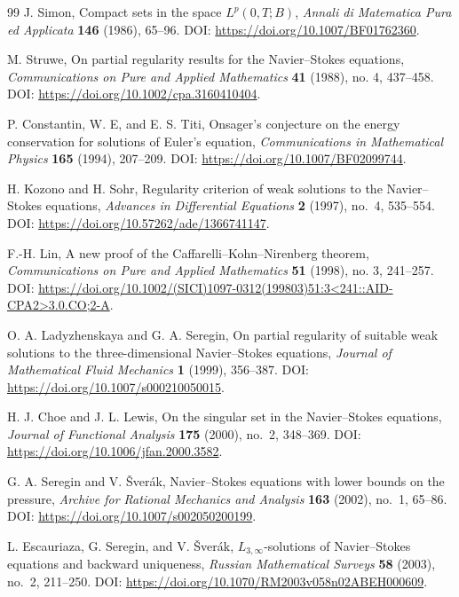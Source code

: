 \documentclass[11pt]{article}
\numberwithin{equation}{section}
\begin{document}
\begin{thebibliography}{99}
	J. Simon,
	Compact sets in the space $L^p(0,T;B)$,
	\newblock \emph{Annali di Matematica Pura ed Applicata} \textbf{146} (1986), 65--96.
	\newblock DOI: \url{https://doi.org/10.1007/BF01762360}.

	M. Struwe,
	On partial regularity results for the Navier--Stokes equations,
	\newblock \emph{Communications on Pure and Applied Mathematics} \textbf{41} (1988), no. 4, 437--458.
	\newblock DOI: \url{https://doi.org/10.1002/cpa.3160410404}.

	P. Constantin, W. E, and E. S. Titi,
	Onsager's conjecture on the energy conservation for solutions of Euler's equation,
	\newblock \emph{Communications in Mathematical Physics} \textbf{165} (1994), 207--209.
	\newblock DOI: \url{https://doi.org/10.1007/BF02099744}.

	H. Kozono and H. Sohr,
	Regularity criterion of weak solutions to the Navier--Stokes equations,
	\newblock \emph{Advances in Differential Equations} \textbf{2} (1997), no.~4, 535--554.
	\newblock DOI: \url{https://doi.org/10.57262/ade/1366741147}.

	F.-H. Lin,
	A new proof of the Caffarelli--Kohn--Nirenberg theorem,
	\newblock \emph{Communications on Pure and Applied Mathematics} \textbf{51} (1998), no. 3, 241--257.
	\newblock DOI: \url{https://doi.org/10.1002/(SICI)1097-0312(199803)51:3<241::AID-CPA2>3.0.CO;2-A}.

	O. A. Ladyzhenskaya and G. A. Seregin,
	On partial regularity of suitable weak solutions to the three-dimensional Navier--Stokes equations,
	\newblock \emph{Journal of Mathematical Fluid Mechanics} \textbf{1} (1999), 356--387.
	\newblock DOI: \url{https://doi.org/10.1007/s000210050015}.

	H. J. Choe and J. L. Lewis,
	On the singular set in the Navier--Stokes equations,
	\newblock \emph{Journal of Functional Analysis} \textbf{175} (2000), no.~2, 348--369.
	\newblock DOI: \url{https://doi.org/10.1006/jfan.2000.3582}.

	G. A. Seregin and V. \v{S}ver\'ak,
	Navier--Stokes equations with lower bounds on the pressure,
	\newblock \emph{Archive for Rational Mechanics and Analysis} \textbf{163} (2002), no.~1, 65--86.
	\newblock DOI: \url{https://doi.org/10.1007/s002050200199}.

	L. Escauriaza, G. Seregin, and V. \v{S}ver\'ak,
	\(L_{3,\infty}\)-solutions of Navier--Stokes equations and backward uniqueness,
	\newblock \emph{Russian Mathematical Surveys} \textbf{58} (2003), no.~2, 211--250.
	\newblock DOI: \url{https://doi.org/10.1070/RM2003v058n02ABEH000609}.


\end{thebibliography}
\end{document}
